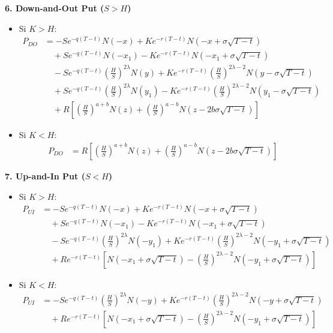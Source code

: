 \textbf{6. Down-and-Out Put ($S > H$)}
\begin{itemize}
    \item Si $K > H$:
    \begin{align*}
    P_{DO} &= -S e^{-q(T-t)} N(-x) + K e^{-r(T-t)} N(-x + \sigma\sqrt{T-t}) \\
    &\quad + S e^{-q(T-t)} N(-x_1) - K e^{-r(T-t)} N(-x_1 + \sigma\sqrt{T-t}) \\
    &\quad - S e^{-q(T-t)} \left(\frac{H}{S}\right)^{2\lambda} N(y) + K e^{-r(T-t)} \left(\frac{H}{S}\right)^{2\lambda - 2} N(y - \sigma\sqrt{T-t}) \\
    &\quad + S e^{-q(T-t)} \left(\frac{H}{S}\right)^{2\lambda} N(y_1) - K e^{-r(T-t)} \left(\frac{H}{S}\right)^{2\lambda - 2} N(y_1 - \sigma\sqrt{T-t}) \\
    &\quad + R \left[ \left(\frac{H}{S}\right)^{a+b} N(z) + \left(\frac{H}{S}\right)^{a-b} N(z - 2b\sigma\sqrt{T-t}) \right]
    \end{align*}
    \item Si $K < H$:
    \begin{align*}
    P_{DO} &= R \left[ \left(\frac{H}{S}\right)^{a+b} N(z) + \left(\frac{H}{S}\right)^{a-b} N(z - 2b\sigma\sqrt{T-t}) \right]
    \end{align*}
\end{itemize}

\textbf{7. Up-and-In Put ($S < H$)}
\begin{itemize}
    \item Si $K > H$:
    \begin{align*}
    P_{UI} &= -S e^{-q(T-t)} N(-x) + K e^{-r(T-t)} N(-x + \sigma\sqrt{T-t}) \\
    &\quad + S e^{-q(T-t)} N(-x_1) - K e^{-r(T-t)} N(-x_1 + \sigma\sqrt{T-t}) \\
    &\quad - S e^{-q(T-t)} \left(\frac{H}{S}\right)^{2\lambda} N(-y_1) + K e^{-r(T-t)}\left(\frac{H}{S}\right)^{2\lambda - 2} N(-y_1 + \sigma\sqrt{T-t}) \\
    &\quad + R e^{-r(T-t)} \left[ N(-x_1 + \sigma \sqrt{T-t}) - \left(\frac{H}{S}\right)^{2\lambda - 2} N(-y_1 + \sigma\sqrt{T-t}) \right]
    \end{align*}
    \item Si $K < H$:
    \begin{align*}
    P_{UI} &= -S e^{-q(T-t)} \left(\frac{H}{S}\right)^{2\lambda} N(-y) + K e^{-r(T-t)} \left(\frac{H}{S}\right)^{2\lambda - 2} N(-y + \sigma\sqrt{T-t}) \\
    &\quad + R e^{-r(T-t)} \left[ N(-x_1 + \sigma \sqrt{T-t}) - \left(\frac{H}{S}\right)^{2\lambda - 2} N(-y_1 + \sigma\sqrt{T-t}) \right]
    \end{align*}
\end{itemize}

